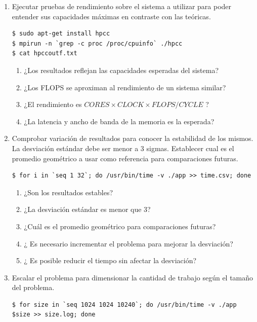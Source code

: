\documentclass[a4paper]{report}
\begin{document}
\begin{enumerate}
\item Ejecutar pruebas de rendimiento sobre el sistema a utilizar para poder entender sus capacidades máximas en contraste con las teóricas.

\begin{lstlisting}
$ sudo apt-get install hpcc
$ mpirun -n `grep -c proc /proc/cpuinfo` ./hpcc
$ cat hpccoutf.txt
\end{lstlisting}

\begin{enumerate}
\item ¿Los resultados reflejan las capacidades esperadas del sistema?
\item ¿Los FLOPS se aproximan al rendimiento de un sistema similar?
\item ¿El rendimiento es $ CORES \times CLOCK \times FLOPS/CYCLE $ ?
\item ¿La latencia y ancho de banda de la memoria es la esperada?
\end{enumerate}

\item Comprobar variación de resultados para conocer la estabilidad de los mismos. La desviación estándar debe ser menor a 3 sigmas. Establecer cual es el promedio geométrico  a usar como referencia para comparaciones futuras.

\begin{lstlisting}
$ for i in `seq 1 32`; do /usr/bin/time -v ./app >> time.csv; done
\end{lstlisting}

\begin{enumerate}
\item ¿Son los resultados estables?
\item ¿La desviación estándar es menor que 3?
\item ¿Cuál es el promedio geométrico para comparaciones futuras?
\item ¿ Es necesario incrementar el problema para mejorar la desviación?
\item ¿ Es posible reducir el tiempo sin afectar la desviación?
\end{enumerate}

\item Escalar el problema para dimensionar la cantidad de trabajo según el tamaño del problema.

\begin{lstlisting}
$ for size in `seq 1024 1024 10240`; do /usr/bin/time -v ./app $size >> size.log; done
\end{lstlisting}


\end{enumerate}
\end{document}
